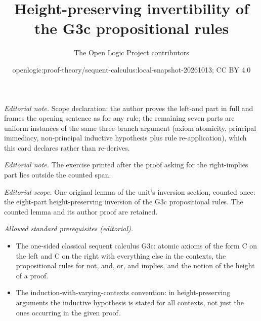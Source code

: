\documentclass[10pt,a4paper]{article}
\title{Height-preserving invertibility of the G3c propositional rules}
\author{The Open Logic Project contributors}
\date{openlogic:proof-theory/sequent-calculus:local-snapshot-20261013; CC BY 4.0}
\theoremstyle{plain}
\theoremstyle{definition}
\theoremstyle{remark}
\begin{document}
\maketitle
\noindent\textit{Editorial note.} Scope declaration: the author proves the left-and part in full and frames the opening sentence as for any rule; the remaining seven parts are uniform instances of the same three-branch argument (axiom atomicity, principal immediacy, non-principal inductive hypothesis plus rule re-application), which this card declares rather than re-derives.\par\medskip
\noindent\textit{Editorial note.} The exercise printed after the proof asking for the right-implies part lies outside the counted span.\par\medskip
\noindent\textit{Editorial scope.} One original lemma of the unit's inversion section, counted once: the eight-part height-preserving inversion of the G3c propositional rules. The counted lemma and its author proof are retained.\par\medskip
\noindent\textit{Allowed standard prerequisites (editorial).}\begin{itemize}
\item The one-sided classical sequent calculus G3c: atomic axioms of the form C on the left and C on the right with everything else in the contexts, the propositional rules for not, and, or, and implies, and the notion of the height of a proof.
\item The induction-with-varying-contexts convention: in height-preserving arguments the inductive hypothesis is stated for all contexts, not just the ones occurring in the given proof.
\end{itemize}\medskip
\end{document}

